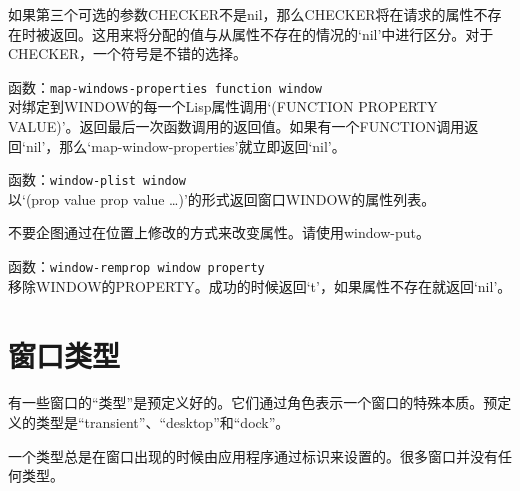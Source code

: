 \documentclass{book}
\begin{document}
\begin{CJK*}{UTF8}{gbsn}
\begin{description}
如果第三个可选的参数CHECKER不是nil，那么CHECKER将在请求的属性不存在时被返回。这用来将分配的值与从属性不存在的情况的`nil'中进行区分。对于CHECKER，一个符号是不错的选择。
\item[-{}-] 函数：\verb|map-windows-properties function window|\\
对绑定到WINDOW的每一个Lisp属性调用`(FUNCTION PROPERTY VALUE)'。返回最后一次函数调用的返回值。如果有一个FUNCTION调用返回`nil'，那么`map-window-properties'就立即返回`nil'。
\item[-{}-] 函数：\verb|window-plist window|\\
以`(prop value prop value \ldots )'的形式返回窗口WINDOW的属性列表。

不要企图通过在位置上修改的方式来改变属性。请使用window-put。
\item[-{}-] 函数：\verb|window-remprop window property|\\
移除WINDOW的PROPERTY。成功的时候返回`t'，如果属性不存在就返回`nil'。
\end{description}
\section{窗口类型}
有一些窗口的``类型''是预定义好的。它们通过角色表示一个窗口的特殊本质。预定义的类型是``transient''、``desktop''和``dock''。

一个类型总是在窗口出现的时候由应用程序通过标识来设置的。很多窗口并没有任何类型。


\end{CJK*}
\end{document}
